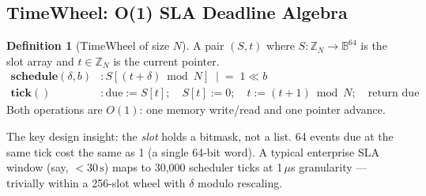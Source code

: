 \documentclass[12pt,a4paper]{article}
\theoremstyle{definition}
\newtheorem{definition}[theorem]{Definition}
\theoremstyle{remark}
\newcommand{\B}{\mathbb{B}}
\begin{document}
\subsection{TimeWheel: O(1) SLA Deadline Algebra}

\begin{definition}[TimeWheel of size $N$]
A pair $(S, t)$ where $S : \mathbb{Z}_N \to \B^{64}$ is the slot array
and $t \in \mathbb{Z}_N$ is the current pointer.
\begin{align*}
  \textbf{schedule}(\delta, b) &: S[(t + \delta) \bmod N] \;\mathrel{|}=\; 1 \ll b \\
  \textbf{tick}()              &: \mathrm{due} := S[t];\quad S[t] := 0;\quad
                                  t := (t+1) \bmod N;\quad \text{return } \mathrm{due}
\end{align*}
Both operations are $O(1)$: one memory write/read and one pointer advance.
\end{definition}

The key design insight: the \emph{slot} holds a bitmask, not a list.
64 events due at the same tick cost the same as 1 (a single 64-bit word).
A typical enterprise SLA window (say, $< 30\,\text{s}$) maps to 30,000 scheduler ticks
at 1\,$\mu$s granularity --- trivially within a 256-slot wheel with $\delta$ modulo rescaling.
\end{document}
